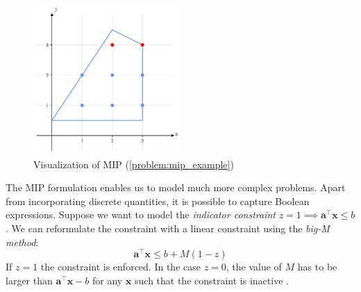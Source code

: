 \begin{figure}[h!]
    \centering
    \includegraphics[width=0.5\textwidth]{Images/mip.pdf}
    \caption{Visualization of MIP (\cref{problem:mip_example})}
    \label{fig:mip}
\end{figure}

The MIP formulation enables us to model much more complex problems. Apart from incorporating discrete quantities, it is possible to capture Boolean expressions. Suppose we want to model the \textit{indicator constraint} $z = 1 \implies \boldsymbol a^\intercal \mathbf x \leq b$. We can reformulate the constraint with a linear constraint using the \textit{big-M method}: 
\begin{equation*}
    \boldsymbol a^\intercal \mathbf x \leq b + M(1-z)
\end{equation*}
If $z=1$ the constraint is enforced. In the case $z=0$, the value of $M$ has to be larger than $\boldsymbol a^\intercal \mathbf x - b$ for any $\mathbf x$ such that the constraint is inactive \cite{aps_mosek_nodate}.

